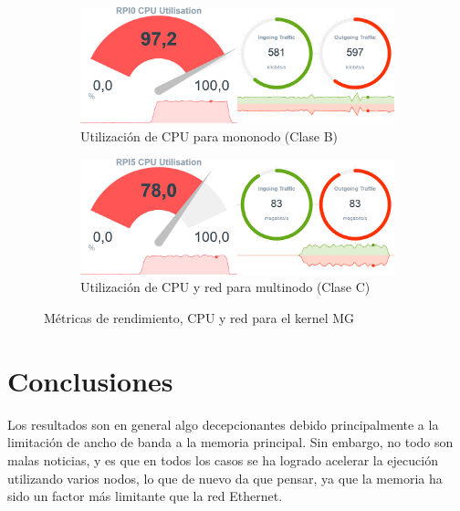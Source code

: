 \begin{figure}[htbp]
    \begin{subfigure}[c]{0.75\textwidth}
        \includegraphics[width=\textwidth]{img/benchmark_rev/mg_rev_sn.png}
        \caption{Utilización de CPU para mononodo (Clase B)}
        \label{fig:mops_rev_sn__mg}
    \end{subfigure}

    \vspace{0.5cm}
    
    \begin{subfigure}[c]{0.75\textwidth}
        \includegraphics[width=\textwidth]{img/benchmark_rev/mg_rev_mn.png}
        \caption{Utilización de CPU y red para multinodo (Clase C)}
        \label{fig:mops_rev_mn__mg}
    \end{subfigure}
    \caption{Métricas de rendimiento, CPU y red para el kernel MG}
    \label{fig:mops__mg}
\end{figure}

\FloatBarrier

\section{Conclusiones}
\label{sec:conclusiones_medida_rendimiento}
Los resultados son en general algo decepcionantes debido principalmente a la limitación de ancho de banda a la memoria principal. Sin embargo, no todo son malas noticias, y es que en todos los casos se ha logrado acelerar la ejecución utilizando varios nodos, lo que de nuevo da que pensar, ya que la memoria ha sido un factor más limitante que la red Ethernet.

